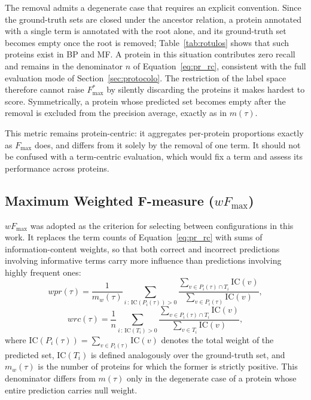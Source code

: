 \documentclass[Ingles]{ic-tese-v3}
\begin{document}
The removal admits a degenerate case that requires an explicit convention. Since
the ground-truth sets are closed under the ancestor relation, a protein annotated
with a single term is annotated with the root alone, and its ground-truth set
becomes empty once the root is removed; Table~\ref{tab:rotulos} shows that such
proteins exist in BP and MF. A protein in this situation contributes zero recall
and remains in the denominator $n$ of Equation~\ref{eq:pr_rc}, consistent with
the full evaluation mode of Section~\ref{sec:protocolo}. The restriction of the
label space therefore cannot raise $F_{\max}^{*}$ by silently discarding the
proteins it makes hardest to score. Symmetrically, a protein whose predicted set
becomes empty after the removal is excluded from the precision average, exactly
as in $m(\tau)$.

This metric remains protein-centric: it aggregates per-protein proportions
exactly as $F_{\max}$ does, and differs from it solely by the removal of one
term. It should not be confused with a term-centric evaluation, which would fix a
term and assess its performance across proteins.

\subsection{Maximum Weighted F-measure (\texorpdfstring{$wF_{\max}$}{wFmax})}
\label{subsec:wfmax}

$wF_{\max}$ was adopted as the criterion for selecting between configurations in
this work. It replaces the term counts of Equation~\ref{eq:pr_rc} with sums of
information-content weights, so that both correct and incorrect predictions
involving informative terms carry more influence than predictions involving
highly frequent ones:
\begin{equation}
\label{eq:wpr}
wpr(\tau) = \frac{1}{m_w(\tau)}
\sum_{i \,:\, \mathrm{IC}(P_i(\tau)) > 0}
\frac{\sum_{v \in P_i(\tau) \cap T_i} \mathrm{IC}(v)}
     {\sum_{v \in P_i(\tau)} \mathrm{IC}(v)},
\end{equation}
\begin{equation}
\label{eq:wrc}
wrc(\tau) = \frac{1}{n} \sum_{i \,:\, \mathrm{IC}(T_i) > 0}
\frac{\sum_{v \in P_i(\tau) \cap T_i} \mathrm{IC}(v)}
     {\sum_{v \in T_i} \mathrm{IC}(v)},
\end{equation}
\noindent where $\mathrm{IC}(P_i(\tau)) = \sum_{v \in P_i(\tau)} \mathrm{IC}(v)$ denotes
the total weight of the predicted set, $\mathrm{IC}(T_i)$ is defined analogously
over the ground-truth set, and $m_w(\tau)$ is the number of proteins for which
the former is strictly positive. This denominator differs from $m(\tau)$ only in
the degenerate case of a protein whose entire prediction carries null weight.
\end{document}
